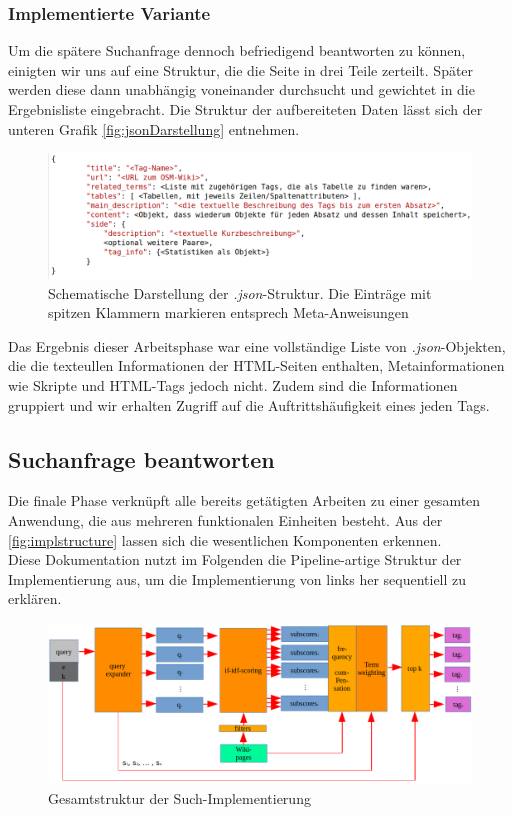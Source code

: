 \documentclass[12pt,pdftex,a4paper]{article}
\begin{document}
\subsubsection{Implementierte Variante}
Um die spätere Suchanfrage dennoch befriedigend beantworten zu können, einigten wir uns auf eine Struktur, die die Seite in drei Teile zerteilt. Später werden diese dann unabhängig voneinander durchsucht und gewichtet in die Ergebnisliste eingebracht. Die Struktur der aufbereiteten Daten lässt sich der unteren Grafik \autoref{fig:jsonDarstellung} entnehmen.\\
\begin{figure}[h]
	\centering
	\includegraphics[width=0.9\linewidth]{Bilder/json_structure}
	\caption[Schematische Darstellung]{Schematische Darstellung der \textit{.json}-Struktur. Die Einträge mit spitzen Klammern markieren entsprech Meta-Anweisungen}
	\label{fig:jsonDarstellung}
\end{figure}
Das Ergebnis dieser Arbeitsphase war eine vollständige Liste von \textit{.json}-Objekten, die die texteullen Informationen der HTML-Seiten enthalten, Metainformationen wie Skripte und HTML-Tags jedoch nicht. Zudem sind die Informationen gruppiert und wir erhalten Zugriff auf die Auftrittshäufigkeit eines jeden Tags.

\subsection{Suchanfrage beantworten}
Die finale Phase verknüpft alle bereits getätigten Arbeiten zu einer gesamten Anwendung, die aus mehreren funktionalen Einheiten besteht. Aus der \autoref{fig:implstructure} lassen sich die wesentlichen Komponenten erkennen. \\
Diese Dokumentation nutzt im Folgenden die Pipeline-artige Struktur der Implementierung aus, um die Implementierung von links her sequentiell zu erklären.

\begin{figure}[h]
	\centering
	\includegraphics[width=1.0\linewidth]{Bilder/impl_structure}
	\caption[Schematische Darstellung]{Gesamtstruktur der Such-Implementierung}
	\label{fig:implstructure}
\end{figure}
\end{document}
